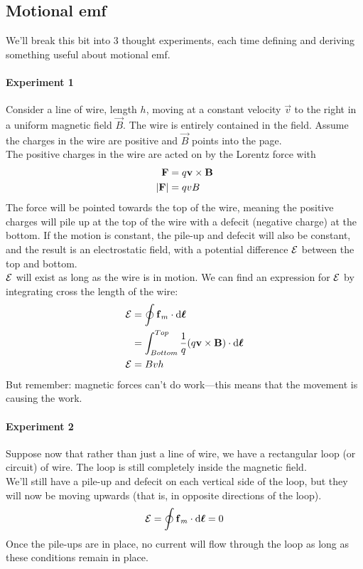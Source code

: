 \documentclass[a4paper]{article}
\begin{document}
\subsection{Motional emf}
We'll break this bit into 3 thought experiments, each time defining and deriving
something useful about motional emf.

\paragraph{Experiment 1}
Consider a line of wire, length $h$, moving at a constant velocity $\vec{v}$
to the right
in a uniform magnetic field $\vec{B}$. The wire is entirely contained in the
field. Assume the charges in the wire are positive and $\vec{B}$ points into
the page.\\
The positive charges in the wire are acted on by the Lorentz force with
\begin{align*}
	\boldsymbol{\mathbf{F}} &= q\boldsymbol{\mathbf{v}}\times\boldsymbol{\mathbf{B}}\\
	\left\lvert \boldsymbol{\mathbf{F}}\right\rvert &= qvB
\end{align*}
The force will be pointed towards the top of the wire, meaning the positive
charges will pile up at the top of the wire with a defecit (negative charge)
at the bottom. If the motion is constant, the pile-up and defecit will also
be constant, and the result is an electrostatic field, with a potential
difference $\mathcal{E}$ between the top and bottom.\\
$\mathcal{E}$ will exist as long as the wire is in motion. We can find an expression
for $\mathcal{E}$ by integrating cross the length of the wire:
\begin{align*}
	\mathcal{E} &= \oint \boldsymbol{\mathbf{f}}_m \cdot \mathrm{d}\boldsymbol{\mathbf{\ell}}\\
	   &= \int_{Bottom}^{Top}
		\frac{1}{q} (q\boldsymbol{\mathbf{v}}\times\boldsymbol{\mathbf{B}}) \cdot \mathrm{d}\boldsymbol{\mathbf{\ell}}\\
	\mathcal{E} &= Bvh
\end{align*}
But remember: magnetic forces can't do work---this means that the movement is
causing the work.

\paragraph{Experiment 2}
Suppose now that rather than just a line of wire, we have a rectangular loop
(or circuit) of wire. The loop is still completely inside the magnetic field.\\
We'll still have a pile-up and defecit on each vertical side of the loop, but
they will now be moving upwards (that is, in opposite directions of the loop).
\[ \mathcal{E} = \oint \boldsymbol{\mathbf{f}}_m \cdot \mathrm{d}\boldsymbol{\mathbf{\ell}} = 0 \]
Once the pile-ups are in place, no current will flow through the loop as long
as these conditions remain in place.
\end{document}
